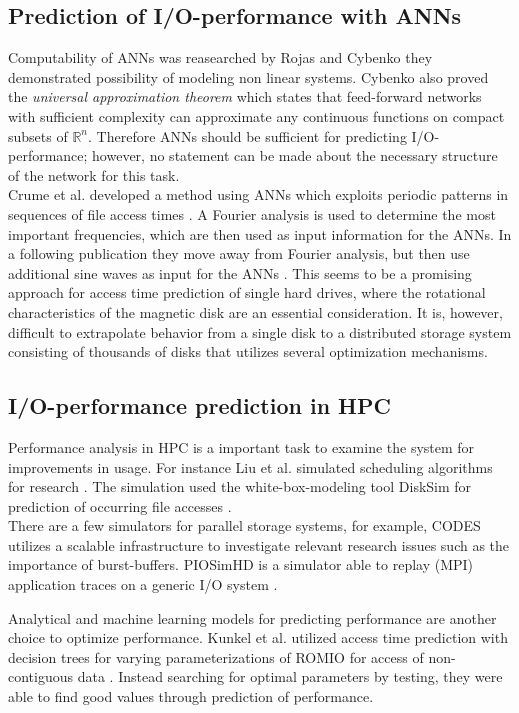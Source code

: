 \documentclass{superfri}
\begin{document}
\subsection{Prediction of I/O-performance with ANNs}
Computability of ANNs was reasearched by Rojas \cite{Rojas:1996:NNS:235222} and Cybenko \cite{cybenko:mcss} they demonstrated possibility of modeling non linear systems. Cybenko also proved the \textit{universal approximation theorem} which states that feed-forward networks with sufficient complexity can approximate any continuous functions on compact subsets of $\mathbb{R}^n$.
Therefore ANNs should be sufficient for predicting I/O-performance; however, no statement can be made about the necessary structure of the network for this task.\\
Crume et al. developed a method using ANNs which exploits periodic patterns in sequences of file access times \cite{Crume:2013:FML:2538542.2538561}.
A Fourier analysis is used to determine the most important frequencies, which are then used as input information for the ANNs.
In a following publication they move away from Fourier analysis, but then use additional sine waves as input for the ANNs \cite{crumelatent}.
This seems to be a promising approach for access time prediction of single hard drives, where the rotational characteristics of the magnetic disk are an essential consideration. It is, however, difficult to extrapolate behavior from a single disk to a distributed storage system consisting of thousands of disks that utilizes several optimization mechanisms.

\subsection{I/O-performance prediction in HPC}
Performance analysis in HPC is a important task to examine the system for improvements in usage.
For instance Liu et al. simulated scheduling algorithms for research \cite{liu2011towards}. 
The simulation used the white-box-modeling tool DiskSim for prediction of occurring file accesses \cite{Bucy08thedisksim}.\\
There are a few simulators for parallel storage systems, for example, CODES\,\cite{cope2011codes} utilizes a scalable infrastructure to investigate relevant research issues such as the importance of burst-buffers.
PIOSimHD is a simulator able to replay (MPI) application traces on a generic I/O system \cite{kunkel2013simulating}.

Analytical and machine learning models for predicting performance are another choice to optimize performance.
Kunkel et al. utilized access time prediction with decision trees for varying parameterizations of ROMIO for access of non-contiguous data \cite{UMLTPTPONI15}. 
Instead searching for optimal parameters by testing, they were able to find good values through prediction of performance.
\end{document}
